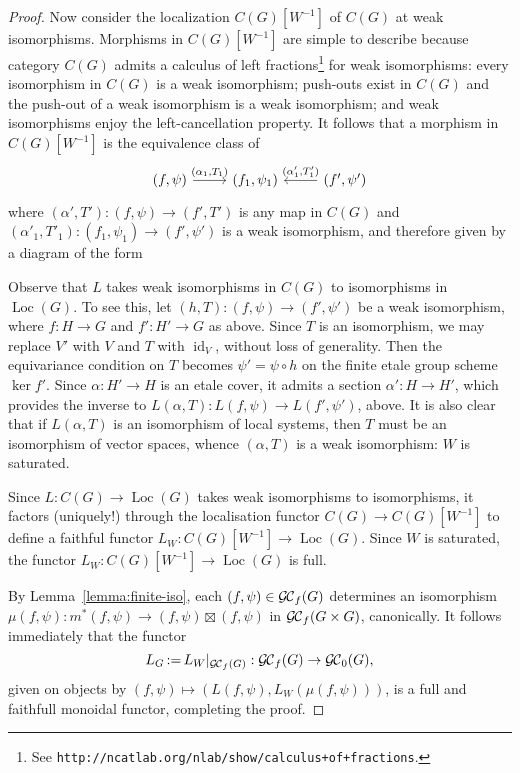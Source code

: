 \documentclass[11pt]{amsart}
\theoremstyle{plain}
\theoremstyle{definition}
\theoremstyle{remark}
\DeclareMathOperator{\id}{id}
\newcommand{\ceq}{{\, :=\, }}
\newcommand{\GC}{{\mathcal{G\hskip-0.8pt C}}}
\newcommand{\GCb}{{\GC_0}}
\newcommand{\GCf}{{\GC_f}}
\newcommand{\Loc}{{\operatorname{Loc}}}
\begin{document}
\begin{proof}
 Now consider the localization $C(G)[W^{-1}]$ of $C(G)$ at weak isomorphisms.
 Morphisms in $C(G)[W^{-1}]$ are simple to describe because category $C(G)$ 
 admits a calculus of left fractions\footnote{See {\tt http://ncatlab.org/nlab/show/calculus+of+fractions}.} for weak isomorphisms: 
 every isomorphism in $C(G)$ is a weak isomorphism; 
 push-outs exist in $C(G)$ and the push-out of a weak isomorphism is a weak isomorphism; 
 and weak isomorphisms enjoy the left-cancellation property. 
 It follows that a morphism in $C(G)[W^{-1}]$ is the equivalence class of 
  \begin{equation}\label{eq:morGCf}
   \begin{tikzcd}
   (f,\psi) \arrow{r}{(\alpha_1,T_1)} & (f_1,\psi_1) & \arrow[swap]{l}{(\alpha'_1,T'_1)} (f',\psi')
   \end{tikzcd}
  \end{equation}
 where $(\alpha',T') : (f,\psi) \to (f',T')$ is any map in $C(G)$ 
 and $(\alpha'_1,T'_1) : (f_1,\psi_1) \to (f',\psi')$ is a weak isomorphism,
 and therefore given by a diagram of the form

 Observe that $L$ takes weak isomorphisms in $C(G)$ to isomorphisms in $\Loc(G)$. 
 To see this, let $(h,T) : (f,\psi)\to (f',\psi')$ be a weak isomorphism, 
 where $f:H\to G$ and $f':H'\to G$ as above. 
 Since $T$ is an isomorphism, we may replace $V'$ with $V$ and $T$ with $\id_V$, without loss of generality. 
 Then the equivariance condition on $T$ becomes $\psi' = \psi\circ h$ on the finite etale group scheme $\ker f'$. 
 Since $\alpha : H'\to H$ is an etale cover, it admits a section $\alpha' : H \to H'$, 
 which provides the inverse to $L(\alpha,T) : L(f,\psi) \to L(f',\psi')$, above. 
 It is also clear that if $L(\alpha,T)$ is an isomorphism of local systems, 
 then $T$ must be an isomorphism of vector spaces, 
 whence $(\alpha,T)$ is a weak isomorphism: $W$ is saturated.
  
 Since $L : C(G) \to \Loc(G)$ takes weak isomorphisms to isomorphisms,
 it factors (uniquely!) through the localisation functor $C(G) \to C(G)[W^{-1}]$ 
 to define a faithful functor $L_{W} : C(G)[W^{-1}] \to \Loc(G)$. 
 Since $W$ is saturated, the functor $L_{W} : C(G)[W^{-1}] \to \Loc(G)$ is full. 
   
 By Lemma~\ref{lemma:finite-iso}, each $(f,\psi) \in \GCf(G)$ determines 
 an isomorphism $\mu(f,\psi) : m^*(f,\psi) \to (f,\psi) \boxtimes (f,\psi)$ in $\GCf(G\times G)$, canonically.
 It follows immediately that the functor 
 \[
 L_G  \ceq  L_{W}\vert_{\GCf(G)} : \GCf(G) \to \GCb(G),
 \] 
 given on objects by $(f,\psi) \mapsto (L(f,\psi), L_{W}(\mu(f,\psi)))$,
 is a full and faithfull monoidal functor, completing the proof.
\end{proof}
\end{document}
